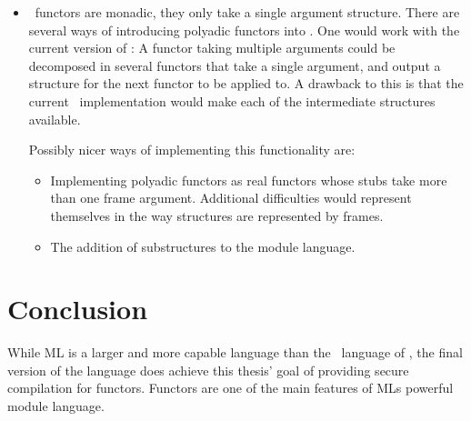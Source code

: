 \begin{itemize}
\item
\MiniML\ functors are monadic, they only take a single argument structure.
There are several ways of introducing polyadic functors into \MiniML.
One would work with the current version of \MiniML:
A functor taking multiple arguments could be decomposed in several functors that take a single argument, and output a structure for the next functor to be applied to. 
A drawback to this is that the current \MiniML\ implementation would make each of the intermediate structures available.

Possibly nicer ways of implementing this functionality are:
\begin{itemize}
\item Implementing polyadic functors as real functors whose stubs take more than one frame argument.
Additional difficulties would represent themselves in the way structures are represented by frames.
\item The addition of substructures to the module language.
\end{itemize}
\end{itemize}


\section{Conclusion}
\label{sec:Conclusion}
While ML is a larger and more capable language than the \MiniML\ language of , the final version of the language does achieve this thesis' goal of providing secure compilation for functors.
Functors are one of the main features of MLs powerful module language.